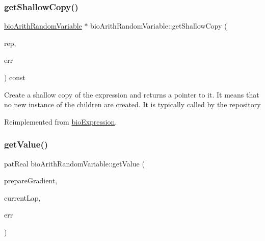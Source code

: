 \mbox{\label{classbio_arith_random_variable_a970e51cefe17a32b0c752e8bef35285f}} 
\subsubsection{\texorpdfstring{get\+Shallow\+Copy()}{getShallowCopy()}}
{\footnotesize\ttfamily \hyperlink{classbio_arith_random_variable}{bio\+Arith\+Random\+Variable} $\ast$ bio\+Arith\+Random\+Variable\+::get\+Shallow\+Copy (\begin{DoxyParamCaption}\item[{\hyperlink{classbio_expression_repository}{bio\+Expression\+Repository} $\ast$}]{rep,  }\item[{pat\+Error $\ast$\&}]{err }\end{DoxyParamCaption}) const\hspace{0.3cm}{\ttfamily [virtual]}}

Create a shallow copy of the expression and returns a pointer to it. It means that no new instance of the children are created. It is typically called by the repository 

Reimplemented from \hyperlink{classbio_expression_a442534762693b92baaf33928979a1bf8}{bio\+Expression}.

\mbox{\label{classbio_arith_random_variable_adc6a79d35ee6e66e59c3be9bc9f2c32b}} 
\subsubsection{\texorpdfstring{get\+Value()}{getValue()}}
{\footnotesize\ttfamily pat\+Real bio\+Arith\+Random\+Variable\+::get\+Value (\begin{DoxyParamCaption}\item[{pat\+Boolean}]{prepare\+Gradient,  }\item[{pat\+U\+Long}]{current\+Lap,  }\item[{pat\+Error $\ast$\&}]{err }\end{DoxyParamCaption})\hspace{0.3cm}{\ttfamily [virtual]}}

